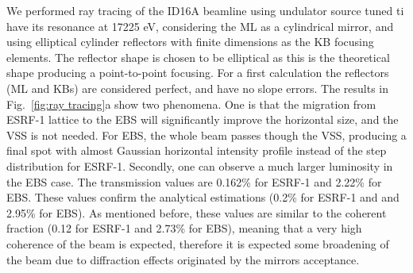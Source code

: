 \documentclass{iucr}              %
\begin{document}
We performed ray tracing of the ID16A beamline using undulator source tuned ti have its resonance at 17225 eV, considering the ML as a cylindrical mirror, and using elliptical cylinder reflectors with finite dimensions as the KB focusing elements. The reflector shape is chosen to be elliptical as this is the theoretical shape producing a point-to-point focusing. For a first calculation the reflectors (ML and KBs) are considered perfect, and have no slope errors. 
The results in Fig.~\ref{fig:ray tracing}a show two phenomena. One is that the migration from ESRF-1 lattice to the EBS will significantly improve the horizontal size, and the VSS is not needed. For EBS, the whole beam passes though the VSS, producing a final spot with almost Gaussian horizontal intensity profile instead of the step distribution for ESRF-1. Secondly, one can observe a much larger luminosity in the EBS case. The transmission values are 0.162\% for ESRF-1 and 2.22\% for EBS. These values confirm the analytical estimations (0.2\% for ESRF-1 and and 2.95\% for EBS). As mentioned before, these values are similar to the coherent fraction \cite{arxivCF} (0.12 for ESRF-1 and 2.73\% for EBS), meaning that a very high coherence of the beam is expected, therefore it is expected some broadening of the beam due to diffraction effects originated by the mirrors acceptance. 
\end{document}
